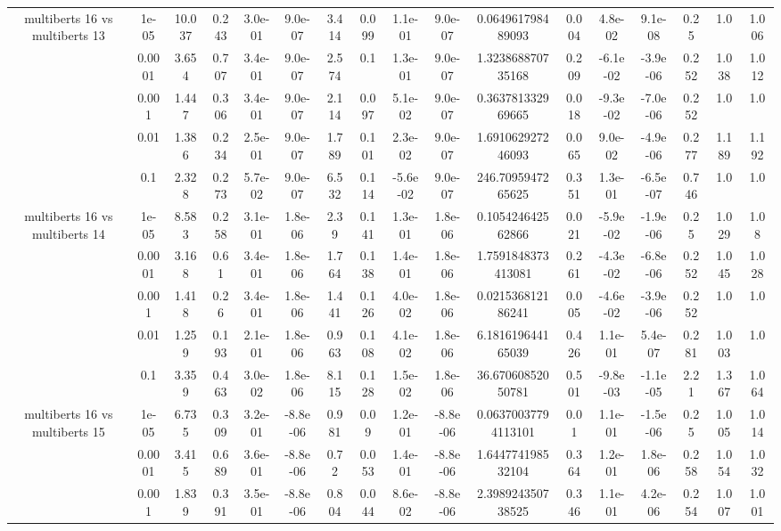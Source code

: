 \begin{tabular}{|c|c|c|c|c|c|c|c|c|c|c|c|c|c|c|c|c|}
\hline
\multirow{5}{*}{multiberts 16 vs multiberts 13} & 1e-05 & 10.037 & 0.243 & 3.0e-01 & 9.0e-07 & 3.414 & 0.099 & 1.1e-01 & 9.0e-07 & 0.064961798489093 & 0.004 & 4.8e-02 & 9.1e-08 & 0.25 & 1.0 & 1.006 \\
 & 0.0001 & 3.654 & 0.707 & 3.4e-01 & 9.0e-07 & 2.574 & 0.1 & 1.3e-01 & 9.0e-07 & 1.323868870735168 & 0.209 & -6.1e-02 & -3.9e-06 & 0.252 & 1.038 & 1.012 \\
 & 0.001 & 1.447 & 0.306 & 3.4e-01 & 9.0e-07 & 2.114 & 0.097 & 5.1e-02 & 9.0e-07 & 0.363781332969665 & 0.018 & -9.3e-02 & -7.0e-06 & 0.252 & 1.0 & 1.0 \\
 & 0.01 & 1.386 & 0.234 & 2.5e-01 & 9.0e-07 & 1.789 & 0.101 & 2.3e-02 & 9.0e-07 & 1.691062927246093 & 0.065 & 9.0e-02 & -4.9e-06 & 0.277 & 1.189 & 1.192 \\
 & 0.1 & 2.328 & 0.273 & 5.7e-02 & 9.0e-07 & 6.532 & 0.114 & -5.6e-02 & 9.0e-07 & 246.7095947265625 & 0.351 & 1.3e-01 & -6.5e-07 & 0.746 & 1.0 & 1.0 \\
\hline
\multirow{5}{*}{multiberts 16 vs multiberts 14} & 1e-05 & 8.583 & 0.258 & 3.1e-01 & 1.8e-06 & 2.39 & 0.141 & 1.3e-01 & 1.8e-06 & 0.105424642562866 & 0.021 & -5.9e-02 & -1.9e-06 & 0.25 & 1.029 & 1.08 \\
 & 0.0001 & 3.168 & 0.61 & 3.4e-01 & 1.8e-06 & 1.764 & 0.138 & 1.4e-01 & 1.8e-06 & 1.7591848373413081 & 0.261 & -4.3e-02 & -6.8e-06 & 0.252 & 1.045 & 1.028 \\
 & 0.001 & 1.418 & 0.26 & 3.4e-01 & 1.8e-06 & 1.441 & 0.126 & 4.0e-02 & 1.8e-06 & 0.021536812186241 & 0.005 & -4.6e-02 & -3.9e-06 & 0.252 & 1.0 & 1.0 \\
 & 0.01 & 1.259 & 0.193 & 2.1e-01 & 1.8e-06 & 0.963 & 0.108 & 4.1e-02 & 1.8e-06 & 6.181619644165039 & 0.426 & 1.1e-01 & 5.4e-07 & 0.281 & 1.003 & 1.0 \\
 & 0.1 & 3.359 & 0.463 & 3.0e-02 & 1.8e-06 & 8.115 & 0.128 & 1.5e-02 & 1.8e-06 & 36.67060852050781 & 0.501 & -9.8e-03 & -1.1e-05 & 2.21 & 1.367 & 1.064 \\
\hline
\multirow{5}{*}{multiberts 16 vs multiberts 15} & 1e-05 & 6.735 & 0.309 & 3.2e-01 & -8.8e-06 & 0.981 & 0.09 & 1.2e-01 & -8.8e-06 & 0.06370037794113101 & 0.01 & 1.1e-01 & -1.5e-06 & 0.25 & 1.005 & 1.014 \\
 & 0.0001 & 3.415 & 0.689 & 3.6e-01 & -8.8e-06 & 0.72 & 0.053 & 1.4e-01 & -8.8e-06 & 1.644774198532104 & 0.364 & 1.2e-01 & 1.8e-06 & 0.258 & 1.054 & 1.032 \\
 & 0.001 & 1.839 & 0.391 & 3.5e-01 & -8.8e-06 & 0.804 & 0.044 & 8.6e-02 & -8.8e-06 & 2.398924350738525 & 0.346 & 1.1e-01 & 4.2e-06 & 0.254 & 1.007 & 1.001 \\

\end{tabular}
